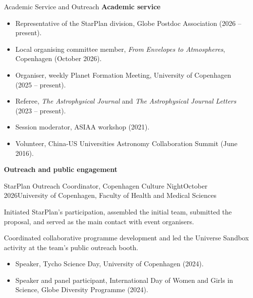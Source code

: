 \documentclass{resume} %
\begin{document}
\begin{rSection}{Academic Service and Outreach}
\textbf{Academic service}
\begin{itemize}
\item Representative of the StarPlan division, Globe Postdoc Association (2026 -- present).
\item Local organising committee member, \emph{From Envelopes to Atmospheres}, Copenhagen (October 2026).
\item Organiser, weekly Planet Formation Meeting, University of Copenhagen (2025 -- present).
\item Referee, \emph{The Astrophysical Journal} and \emph{The Astrophysical Journal Letters} (2023 -- present).
\item Session moderator, ASIAA workshop (2021).
\item Volunteer, China-US Universities Astronomy Collaboration Summit (June 2016).
\end{itemize}

\textbf{Outreach and public engagement}
\begin{rSubsection}{StarPlan Outreach Coordinator, Copenhagen Culture Night}{October 2026}{University of Copenhagen, Faculty of Health and Medical Sciences}{}
\item Initiated StarPlan's participation, assembled the initial team, submitted the proposal, and served as the main contact with event organisers.
\item Coordinated collaborative programme development and led the Universe Sandbox activity at the team's public outreach booth.
\end{rSubsection}
\begin{itemize}
\item Speaker, Tycho Science Day, University of Copenhagen (2024).
\item Speaker and panel participant, International Day of Women and Girls in Science, Globe Diversity Programme (2024).
\end{itemize}
\end{rSection}
\end{document}
